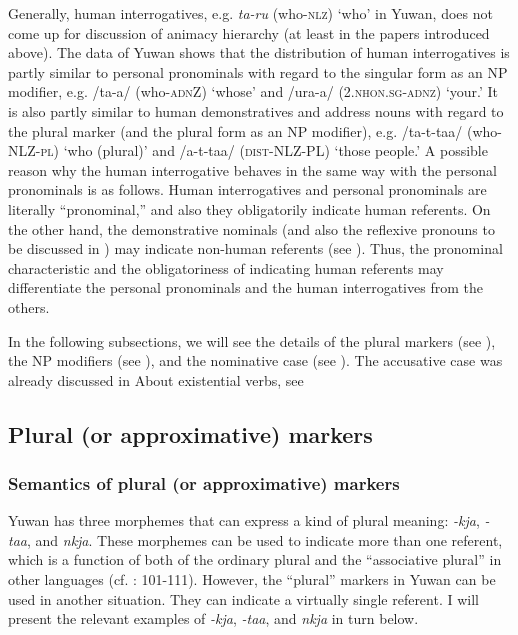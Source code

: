 Generally, human interrogatives, e.g. \textit{ta-ru} (who-\textsc{nlz}) ‘who’ in Yuwan, does not come up for discussion of animacy hierarchy (at least in the papers introduced above). The data of Yuwan shows that the distribution of human interrogatives is partly similar to personal pronominals with regard to the singular form as an NP modifier, e.g. /ta-a/ (who-\textsc{adn}Z) ‘whose’ and /ura-a/ (2.\textsc{nhon}.\textsc{sg}-\textsc{adnz}) ‘your.’ It is also partly similar to human demonstratives and address nouns with regard to the plural marker (and the plural form as an NP modifier), e.g. /ta-t-taa/ (who-NLZ-\textsc{pl}) ‘who (plural)’ and /a-t-taa/ (\textsc{dist}-NLZ-PL) ‘those people.’ A possible reason why the human interrogative behaves in the same way with the personal pronominals is as follows. Human interrogatives and personal pronominals are literally “pronominal,” and also they obligatorily indicate human referents. On the other hand, the demonstrative nominals (and also the reflexive pronouns to be discussed in ) may indicate non-human referents (see ). Thus, the pronominal characteristic and the obligatoriness of indicating human referents may differentiate the personal pronominals and the human interrogatives from the others.

In the following subsections, we will see the details of the plural markers (see ), the NP modifiers (see ), and the nominative case (see ). The accusative case was already discussed in  About existential verbs, see 

\subsection{Plural (or approximative) markers}
\subsubsection{Semantics of plural (or approximative) markers}

Yuwan has three morphemes that can express a kind of plural meaning: \textit{-kja}, \textit{{}-taa}, and \textit{nkja}. These morphemes can be used to indicate more than one referent, which is a function of both of the ordinary plural and the “associative plural” in other languages (cf. \citealt{Corbett2000}: 101-111). However, the “plural” markers in Yuwan can be used in another situation. They can indicate a virtually single referent. I will present the relevant examples of \textit{{}-kja}, \textit{{}-taa}, and \textit{nkja} in turn below.


